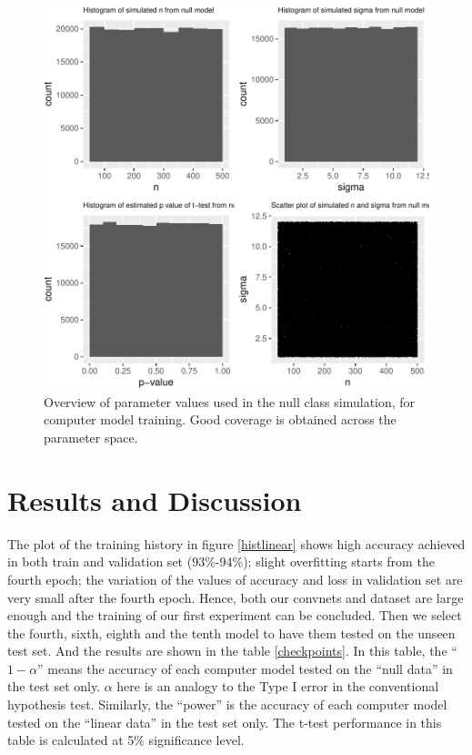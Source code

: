 \documentclass[12pt]{article}
\begin{document}
\begin{figure}
\centering
\includegraphics{pc_plots_files/figure-latex/simp-1.pdf}
\caption{Overview of parameter values used in the null class simulation,
for computer model training. Good coverage is obtained across the
parameter space.}
\end{figure}

\section{Results and Discussion}\label{results-and-discussion}

The plot of the training history in figure \ref{histlinear} shows high
accuracy achieved in both train and validation set (93\%-94\%); slight
overfitting starts from the fourth epoch; the variation of the values of
accuracy and loss in validation set are very small after the fourth
epoch. Hence, both our convnets and dataset are large enough and the
training of our first experiment can be concluded. Then we select the
fourth, sixth, eighth and the tenth model to have them tested on the
unseen test set. And the results are shown in the table
\ref{checkpoints}. In this table, the ``\(1-\alpha\)'' means the
accuracy of each computer model tested on the ``null data'' in the test
set only. \(\alpha\) here is an analogy to the Type I error in the
conventional hypothesis test. Similarly, the ``power'' is the accuracy
of each computer model tested on the ``linear data'' in the test set
only. The t-test performance in this table is calculated at 5\%
significance level.
\end{document}
